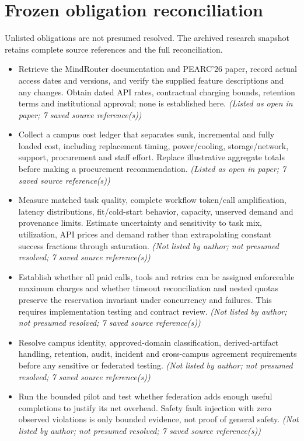 \documentclass[11pt]{article}
\begin{document}
\section{Frozen obligation reconciliation}
Unlisted obligations are not presumed resolved. The archived research snapshot retains complete source references and the full reconciliation.
\begin{itemize}
\item Retrieve the MindRouter documentation and PEARC'26 paper, record actual access dates and versions, and verify the supplied feature descriptions and any changes. Obtain dated API rates, contractual charging bounds, retention terms and institutional approval; none is established here. \textit{ (Listed as open in paper; 7 saved source reference(s))}
\item Collect a campus cost ledger that separates sunk, incremental and fully loaded cost, including replacement timing, power/cooling, storage/network, support, procurement and staff effort. Replace illustrative aggregate totals before making a procurement recommendation. \textit{ (Listed as open in paper; 7 saved source reference(s))}
\item Measure matched task quality, complete workflow token/call amplification, latency distributions, fit/cold-start behavior, capacity, unserved demand and provenance limits. Estimate uncertainty and sensitivity to task mix, utilization, API prices and demand rather than extrapolating constant success fractions through saturation. \textit{ (Not listed by author; not presumed resolved; 7 saved source reference(s))}
\item Establish whether all paid calls, tools and retries can be assigned enforceable maximum charges and whether timeout reconciliation and nested quotas preserve the reservation invariant under concurrency and failures. This requires implementation testing and contract review. \textit{ (Not listed by author; not presumed resolved; 7 saved source reference(s))}
\item Resolve campus identity, approved-domain classification, derived-artifact handling, retention, audit, incident and cross-campus agreement requirements before any sensitive or federated testing. \textit{ (Not listed by author; not presumed resolved; 7 saved source reference(s))}
\item Run the bounded pilot and test whether federation adds enough useful completions to justify its net overhead. Safety fault injection with zero observed violations is only bounded evidence, not proof of general safety. \textit{ (Not listed by author; not presumed resolved; 7 saved source reference(s))}

\end{itemize}
\end{document}
